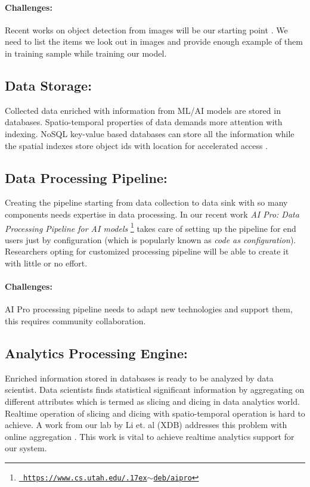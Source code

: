 \vspace{-2mm}
\paragraph{Challenges:}
Recent works on object detection from images will be our starting point \cite{girshick2014rich, mao2014deep}. We need to list the items we look out in images and provide enough example of them in training sample while training our model.


\subsection{Data Storage:}
Collected data enriched with information from ML/AI models are stored in databases. Spatio-temporal properties of data demands more attention with indexing. NoSQL key-value based databases can store all the information while the spatial indexes store object ids with location for accelerated access \cite{christensen2015storm}.

\subsection{Data Processing Pipeline:}
Creating the pipeline starting from data collection to data sink with so many
components needs expertise in data processing. In our recent work {\em AI Pro:
Data Processing Pipeline for AI models}
\footnote{\href{https://www.cs.utah.edu/~deb/aipro}{\texttt{
        https://www.cs.utah.edu/{\raise.17ex\hbox{$\scriptstyle\mathtt{\sim}$}}deb/aipro}}}
 takes care of setting up the pipeline for end users just by configuration (which is popularly known as {\em code as configuration}).
Researchers opting for customized processing pipeline will be able to create it with little or no effort.

\vspace{-2mm}
\paragraph{Challenges:}
AI Pro processing pipeline needs to adapt new technologies and support them, this requires community collaboration.

\subsection{Analytics Processing Engine:}
Enriched information stored in databases is ready to be analyzed by data scientist. Data scientists finds  statistical significant information by aggregating on different attributes which is termed as slicing and dicing in data analytics world. Realtime operation of slicing and dicing with spatio-temporal operation is hard to achieve. A work from our lab by Li et. al (XDB) addresses this problem with online aggregation \cite{li2017wander}. This work is vital to achieve realtime analytics support for our system.


